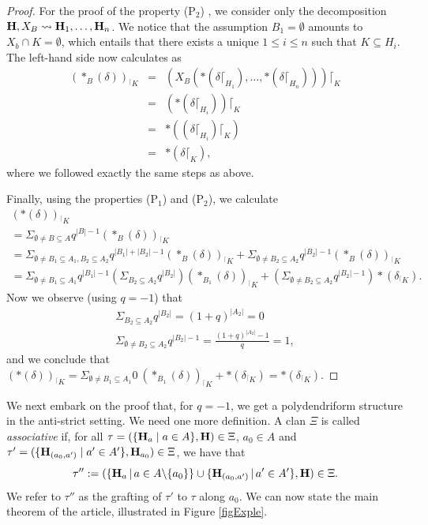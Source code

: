 \documentclass{article}
\theoremstyle{plain}
\theoremstyle{definition}
\newcommand{\inc}{\subseteq}
\newcommand{\set}[1]{\{#1\}}
\newcommand{\setc}[2]{\set{#1 \mid #2}}
\newcommand{\hyper}[1]{{\bf #1}}
\newcommand{\restrconstr}[2]{{#1}_{{}^\lceil {#2}}}
\begin{document}
\begin{proof}
For the proof of  the property (P$_2$) , we consider only the decomposition $\hyper{H},X_B   \leadsto   \hyper{H}_1,\ldots,\hyper{H}_n$. We notice that the assumption $B_1=\emptyset$ amounts to $X_b\cap K=\emptyset$, which entails that there exists a unique $1\leq i\leq n$ such that $K\subseteq H_i$. The left-hand side now calculates as 
 $$\begin{array}{rcl}
\restrconstr{(\ast_B(\delta))}{K} & =&(X_ B(\ast(\delta\lceil_{H_1}),\dots,\ast(\delta\lceil_{H_n})))\lceil_{K} \\[0.1cm]
&=& (\ast (\delta\lceil_{H_i}))\lceil_K \\[0.1cm]
&=& \ast ((\delta\lceil_{H_i}) \lceil_K) \\[0.1cm]
&=& \ast (\delta\lceil_{K}),
\end{array}$$
where we followed exactly the same steps as above.  

\smallskip
 
Finally,
using the properties  (P$_1$) and  (P$_2$), we calculate
$$\begin{array}{l} \restrconstr{(\ast(\delta))}{K} \\
 =  \Sigma_{\emptyset\neq B\inc A} q^{|B|-1} \restrconstr{(\ast_B(\delta))}{K}\\
 =  \Sigma_{\emptyset\neq B_1\inc A_1,B_2\inc A_2} q^{|B_1|+|B_2|-1} \restrconstr{(\ast_B(\delta))}{K} +
\Sigma_{\emptyset\neq B_2\inc A_2} q^{|B_2|-1} \restrconstr{(\ast_B(\delta))}{K}\\
 =  \Sigma_{\emptyset\neq B_1\inc A_1} q^{|B_1|-1}(\Sigma_{B_2\inc A_2} q^{|B_2|})\restrconstr{(\ast_{B_1}(\delta))}{K} +
(\Sigma_{\emptyset\neq B_2\inc A_2} q^{|B_2|-1}) \ast(\restrconstr{\delta}{K}).
\end{array}$$
Now we observe (using $q=-1$) that 
$$\begin{array}{l}
\Sigma_{B_2\inc A_2} q^{|B_2|} = (1+q)^{|A_2|}=0\\
\Sigma_{\emptyset\neq B_2\inc A_2} q^{|B_2|-1} = \frac{(1+q)^{|A_2|}-1}{q}= 1,
\end{array}$$
and we conclude that $ \restrconstr{(\ast(\delta))}{K} = \Sigma_{\emptyset\neq B_1\inc A_1}0 \:\restrconstr{(\ast_{B_1}(\delta))}{K} +
\ast(\restrconstr{\delta}{K}) = \ast(\restrconstr{\delta}{K})$.
\end{proof}


 
We next embark on the proof that, for $q=-1$, we get  a polydendriform structure in the anti-strict  setting. 
We need one more definition. A  clan  $\Xi$ is called  \emph{associative} if,
for all $\tau  =  (\setc{\hyper{H}_a}{a\in A},\hyper{H})\in \Xi$, $a_0\in A$ and
$\tau'= (\setc{\hyper{H}_{(a_0,a')}}{a'\in A'},\hyper{H}_{a_0}) \in\Xi$, we have that
$$\tau'':=(\{{\bf H}_{a}\,|\,a\in A\backslash \{a_0\}\}\cup \{\hyper{H}_{(a_0,a')}\,|\,a'\in A'\},{\bf H})\in\Xi.$$  We  refer to $\tau''$ as the grafting of  
$\tau'$ to  $\tau$ along $a_0$. We can now state the main theorem of the article, illustrated in Figure \ref{figExple}.
\end{document}

